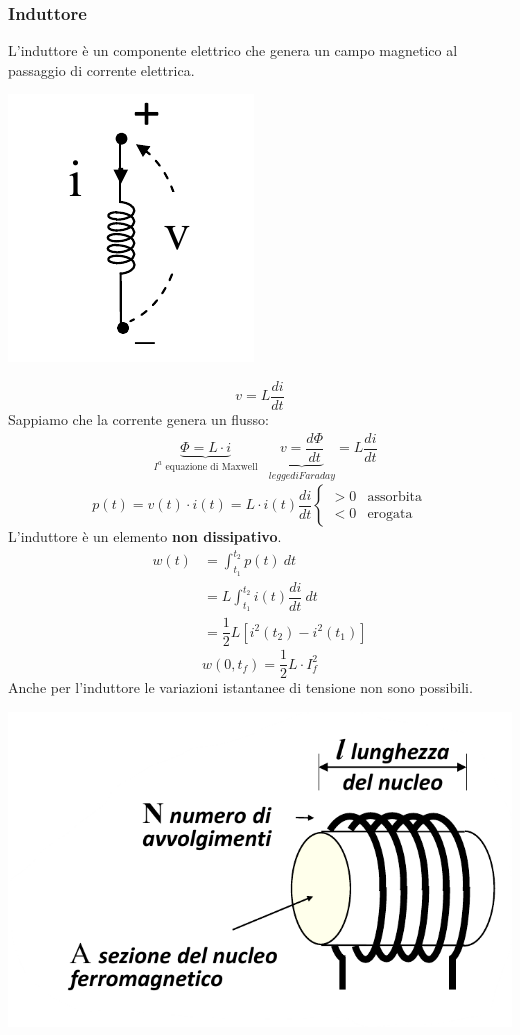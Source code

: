 \documentclass{article}
\begin{document}
\subsubsection{Induttore}
L'induttore è un componente elettrico che genera un campo magnetico al passaggio di corrente elettrica.
\begin{center}
    \includegraphics[scale=0.4]{Image/Induttore.png}
\end{center}
\[
    v= L \dfrac{di}{dt}
\]
Sappiamo che la corrente genera un flusso:
\begin{align*}
    &\underbrace{\Phi = L \cdot i}_{I^a\text{ equazione di Maxwell}} & \underbrace{v= \dfrac{d \Phi}{dt}}_{legge di Faraday} = L \dfrac{di}{dt}
\end{align*}
\[
    p(t) = v(t) \cdot i(t) = L \cdot i(t) \dfrac{di}{dt} \begin{cases}
        >0 &\text{assorbita}\\
        <0 &\text{erogata}
    \end{cases}
\]
L'induttore è un elemento \textbf{non dissipativo}.
\begin{align*}
    w(t) &= \int_{t_1}^{t_2} p(t) \ dt\\
    &=L \int_{t_1}^{t_2}i(t) \dfrac{di}{dt} \ dt \\
    &= \dfrac{1}{2} L \left[ i^2(t_2) -i^2(t_1)  \right]
\end{align*}
\[
    w(0,t_f) = \dfrac{1}{2} L \cdot  I^2_f
\]
Anche per l'induttore le variazioni istantanee di tensione non sono possibili.
\begin{center}
    \includegraphics[scale=0.4]{Image/Induttore ferr.png}
\end{center}
\end{document}
